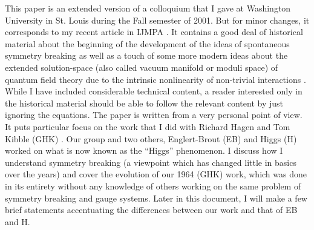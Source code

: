 \documentclass[12pt]{article}
\begin{document}
This paper is an extended version of a colloquium that I gave at Washington
University in St. Louis during the Fall semester of 2001. But for minor
changes, it corresponds to my recent article in IJMPA \cite{gg;2009}. It
contains a good deal of historical material about the beginning of the
development of the ideas of spontaneous symmetry breaking as well as a touch
of some more modern ideas about the extended solution-space (also called
vacuum manifold or moduli space) of quantum field theory due to the intrinsic
nonlinearity of non-trivial interactions \cite{ggg;1996,ggzg;2007}. While I
have included considerable technical content, a reader interested only in the
historical material should be able to follow the relevant content by just
ignoring the equations. The paper is written from a very personal point of
view. It puts particular focus on the work that I did with Richard Hagen and
Tom Kibble (GHK) \cite{ghk;1964}. Our group and two others, Englert-Brout (EB)
\cite{eb;1964} and Higgs (H) \cite{phpl;1964,ph;1964} worked on what is now
known as the ``Higgs'' phenomenon. I discuss how I understand symmetry
breaking (a viewpoint which has changed little in basics over the years) and
cover the evolution of our 1964 (GHK) work, which was done in its entirety
without any knowledge of others working on the same problem of symmetry
breaking and gauge systems. Later in this document, I will make a few brief
statements accentuating the differences between our work and that of EB and H.
\end{document}
